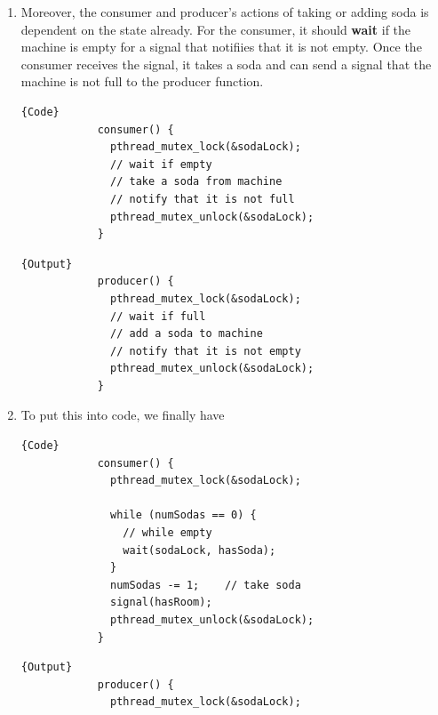 \documentclass{article}
\newcounter{example}[section]
\newcounter{code}[section]
\begin{document}
\begin{example}
\begin{enumerate}
\begin{minipage}{.49\linewidth}
\begin{lstlisting}[]{Output}
              pthread_mutex_unlock(&sodaLock); 
            }
          \end{lstlisting}
          \end{minipage}

        \item Moreover, the consumer and producer's actions of taking or adding soda is dependent on the state already. For the consumer, it should \textbf{wait} if the machine is empty for a signal that notifiies that it is not empty. Once the consumer receives the signal, it takes a soda and can send a signal that the machine is not full to the producer function. 

          \noindent\begin{minipage}{.5\linewidth}
          \begin{lstlisting}[]{Code}
            consumer() {
              pthread_mutex_lock(&sodaLock); 
              // wait if empty
              // take a soda from machine
              // notify that it is not full 
              pthread_mutex_unlock(&sodaLock); 
            }
          \end{lstlisting}
          \end{minipage}
          \hfill
          \begin{minipage}{.49\linewidth}
          \begin{lstlisting}[]{Output}
            producer() {
              pthread_mutex_lock(&sodaLock); 
              // wait if full 
              // add a soda to machine
              // notify that it is not empty 
              pthread_mutex_unlock(&sodaLock); 
            }
          \end{lstlisting}
          \end{minipage}

        \item To put this into code, we finally have 

          \noindent\begin{minipage}{.5\linewidth}
          \begin{lstlisting}[]{Code}
            consumer() {
              pthread_mutex_lock(&sodaLock); 

              while (numSodas == 0) {   
                // while empty 
                wait(sodaLock, hasSoda); 
              }
              numSodas -= 1;    // take soda 
              signal(hasRoom); 
              pthread_mutex_unlock(&sodaLock); 
            }
          \end{lstlisting}
          \end{minipage}
          \hfill
          \begin{minipage}{.49\linewidth}
          \begin{lstlisting}[]{Output}
            producer() {
              pthread_mutex_lock(&sodaLock); 


\end{lstlisting}
\end{minipage}
\end{enumerate}
\end{example}
\end{document}
